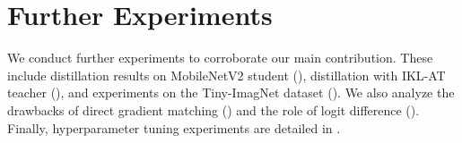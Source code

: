\documentclass{article} %
\begin{document}
\newpage
\appendix
\section{Further Experiments}
We conduct further experiments to corroborate our main contribution.
These include distillation results on MobileNetV2 student (), distillation with IKL-AT teacher (), and experiments on the Tiny-ImagNet dataset (). We also analyze the drawbacks of direct gradient matching () and the role of logit difference ().  Finally, hyperparameter tuning experiments are detailed in .
\end{document}
